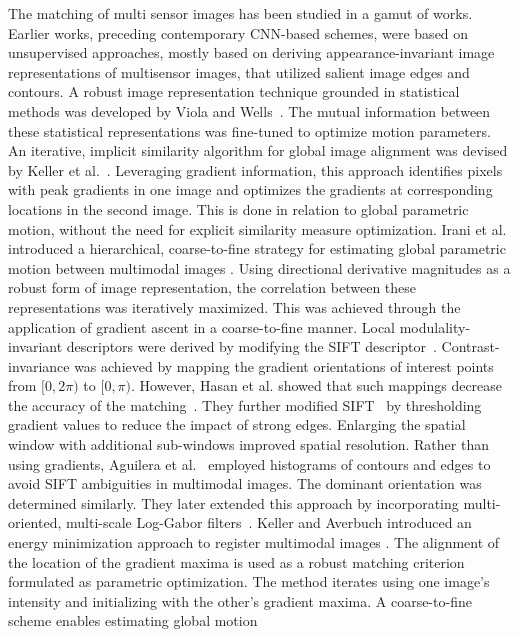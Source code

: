 \documentclass[10pt,journal]{IEEEtran}\usepackage{amsfonts}
\begin{document}
The matching of multi sensor images has been studied in a gamut of works.
Earlier works, preceding contemporary CNN-based schemes, were based on
unsupervised approaches, mostly based on deriving appearance-invariant image
representations of multisensor images, that utilized salient image edges and
contours. A robust image representation technique grounded in statistical
methods was developed by Viola and Wells~\cite{Viola:1997:AMM:263008.263015}. The mutual information between these statistical representations was
fine-tuned to optimize motion parameters. An iterative, implicit similarity
algorithm for global image alignment was devised by Keller et al.~\cite {keller2006multisensor}. Leveraging gradient information, this approach
identifies pixels with peak gradients in one image and optimizes the
gradients at corresponding locations in the second image. This is done in
relation to global parametric motion, without the need for explicit
similarity measure optimization. Irani et al. introduced a hierarchical,
coarse-to-fine strategy for estimating global parametric motion between
multimodal images \cite{irani1998robust}. Using directional derivative
magnitudes as a robust form of image representation, the correlation between
these representations was iteratively maximized. This was achieved through
the application of gradient ascent in a coarse-to-fine manner.
Local modulality-invariant descriptors were derived by modifying the SIFT
descriptor~\cite{chen2009real,MI-SIFT}. Contrast-invariance was achieved by
mapping the gradient orientations of interest points from $[0,2\pi )$ to $[0,\pi )$. However, Hasan et al. showed that such mappings decrease the accuracy of the matching~\cite{hossain2011improved}. They further modified SIFT~\cite {hasan2012modified} by thresholding gradient values to reduce the impact of
strong edges. Enlarging the spatial window with additional sub-windows
improved spatial resolution. Rather than using gradients, Aguilera et al.~\cite{aguilera2012multispectral} employed histograms of contours and edges
to avoid SIFT ambiguities in multimodal images. The dominant orientation was
determined similarly. They later extended this approach by incorporating
multi-oriented, multi-scale Log-Gabor filters~\cite{lghd2015}. Keller and
Averbuch introduced an energy minimization approach to register multimodal
images \cite{1191008}. The alignment of the location of the gradient maxima is used as a
robust matching criterion formulated as parametric optimization. The method
iterates using one image's intensity and initializing with the other's
gradient maxima. A coarse-to-fine scheme enables estimating global motion
\end{document}
